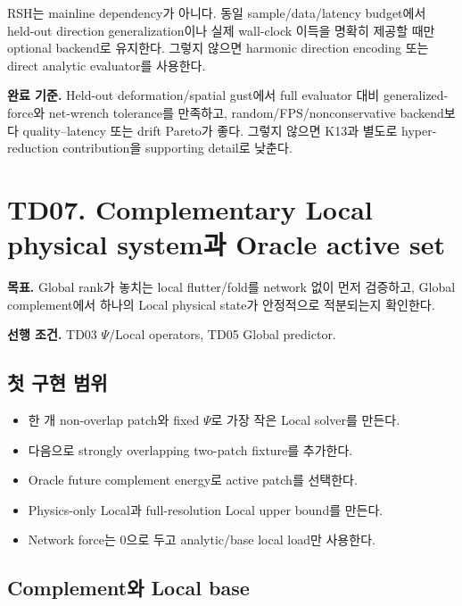 \documentclass[10pt,a4paper]{article}
\newcommand{\todo}{\textcolor{TodoGray}{\(\square\)}}
\begin{document}
\begin{tcolorbox}[colback=LightOrange,colframe=orange!60!black,title=RSH 결정 규칙,fonttitle=\bfseries]
RSH는 mainline dependency가 아니다. 동일 sample/data/latency budget에서 held-out direction generalization이나
실제 wall-clock 이득을 명확히 제공할 때만 optional backend로 유지한다. 그렇지 않으면 harmonic direction encoding 또는 direct analytic evaluator를 사용한다.
\end{tcolorbox}

\textbf{완료 기준.}
Held-out deformation/spatial gust에서 full evaluator 대비 generalized-force와 net-wrench tolerance를 만족하고,
random/FPS/nonconservative backend보다 quality--latency 또는 drift Pareto가 좋다.
그렇지 않으면 K13과 별도로 hyper-reduction contribution을 supporting detail로 낮춘다.

\section{TD07. Complementary Local physical system과 Oracle active set}

\textbf{목표.}
Global rank가 놓치는 local flutter/fold를 network 없이 먼저 검증하고,
Global complement에서 하나의 Local physical state가 안정적으로 적분되는지 확인한다.

\textbf{선행 조건.} TD03 \(\Psi\)/Local operators, TD05 Global predictor.

\subsection*{첫 구현 범위}

\begin{itemize}
  \item[\todo] 한 개 non-overlap patch와 fixed \(\Psi\)로 가장 작은 Local solver를 만든다.
  \item[\todo] 다음으로 strongly overlapping two-patch fixture를 추가한다.
  \item[\todo] Oracle future complement energy로 active patch를 선택한다.
  \item[\todo] Physics-only Local과 full-resolution Local upper bound를 만든다.
  \item[\todo] Network force는 0으로 두고 analytic/base local load만 사용한다.
\end{itemize}

\subsection*{Complement와 Local base}
\end{document}
